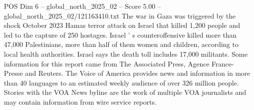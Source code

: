 \begin{textsample}{POS Dim 6 – global\_north\_2025\_02 – Score 5.00 – global\_north\_2025\_02/121163410.txt}
The war in Gaza was triggered by the shock October 2023 Hamas terror attack on Israel that killed 1,200 people and led to the capture of 250 hostages.
Israel ' s counteroffensive killed more than 47,000 Palestinians, more than half of them women and children, according to local health authorities.
Israel says the death toll includes 17,000 militants.
Some information for this report came from The Associated Press, Agence France-Presse and Reuters.
The Voice of America provides news and information in more than 40 languages to an estimated weekly audience of over 326 million people.
Stories with the VOA News byline are the work of multiple VOA journalists and may contain information from wire service reports.

\end{textsample}
